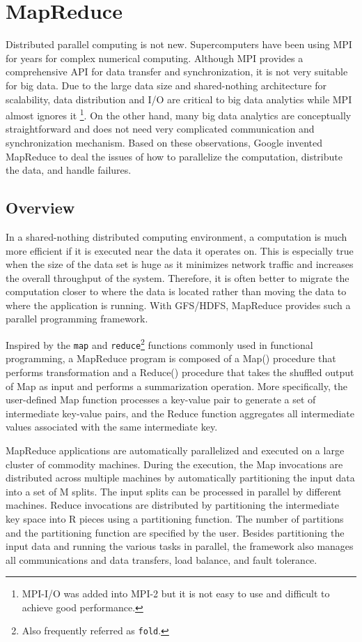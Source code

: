 \documentclass[11pt]{book}
\begin{document}
\section[MapReduce]
{MapReduce}
Distributed parallel computing is not new. Supercomputers have been using MPI \cite{Forum:1994:MMI} for years for complex numerical computing. Although MPI provides a comprehensive API for data transfer and synchronization, it is not very suitable for big data. Due to the large data size and shared-nothing architecture for scalability, data distribution and I/O are critical to big data analytics while MPI almost ignores it \footnote{MPI-I/O \cite{Gropp:1999:UMA} was added into MPI-2 but it is not easy to use and difficult to achieve good performance.}. On the other hand, many big data analytics are conceptually straightforward and does not need very complicated communication and synchronization mechanism. Based on these observations, Google invented MapReduce \cite{Dean:2008:MSD} to deal the issues of how to parallelize the computation, distribute the data, and handle failures.

\subsection{Overview}
In a shared-nothing distributed computing environment, a computation is much more efficient if it is executed near the data it operates on. This is especially true when the size of the data set is huge as it minimizes network traffic and increases the overall throughput of the system. Therefore, it is often better to migrate the computation closer to where the data is located rather than moving the data to where the application is running. With GFS/HDFS, MapReduce provides such a parallel programming framework.

Inspired by the \texttt{map} and \texttt{reduce}\footnote{Also frequently referred as \texttt{fold}.} functions commonly used in functional programming, a MapReduce program is composed of a Map() procedure that performs transformation and a Reduce() procedure that takes the shuffled output of Map as input and performs a summarization operation. More specifically, the user-defined Map function processes a key-value pair to generate a set of intermediate key-value pairs, and the Reduce function aggregates all intermediate values associated with the same intermediate key.

MapReduce applications are automatically parallelized and executed on a large cluster of commodity machines. During the execution, the Map invocations are distributed across multiple machines by automatically partitioning the input data into a set of M splits. The input splits can be processed in parallel by different machines. Reduce invocations are distributed by partitioning the intermediate key space into R pieces using a partitioning function. The number of partitions and the partitioning function are specified by the user. Besides partitioning the input data and running the various tasks in parallel, the framework also manages all communications and data transfers, load balance, and fault tolerance.
\end{document}
